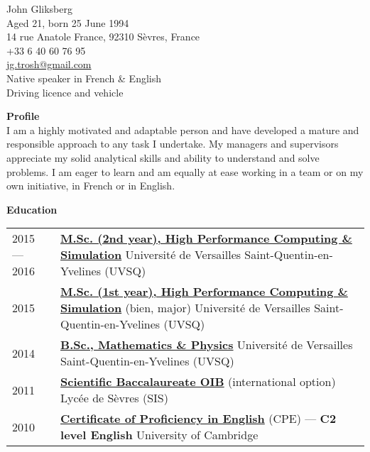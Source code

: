 \documentclass[pdftex,a4paper,10pt]{article}
\begin{document}

{\Large John Gliksberg}
\hrulefill\\
\newline
Aged 21, born 25 June 1994\\
14 rue Anatole France, 92310 Sèvres, France\\[.1cm]
+33 6 40 60 76 95\\
\href{mailto:jg.trosh@gmail.com}
{jg.trosh\makeatletter @\makeatother gmail.com}\\[.1cm]
Native speaker in French \& English\\
Driving licence and vehicle

\begin{center}
\end{center}
\vspace{.3cm}

{\large\bf Profile}
\hrulefill\\[.3cm]
{\setlength{\extrarowheight}{.2cm}
I am a highly motivated and adaptable person and have developed
a mature and responsible approach to any task I undertake.
My managers and supervisors appreciate my solid analytical skills
and ability to understand and solve problems.
I am eager to learn and am equally at ease working in a team
or on my own initiative, in French or in English.
}
\vspace{.3cm}

{\large\bf Education}
\hrulefill\\[.3cm]
{\setlength{\extrarowheight}{.2cm}
\begin{tabularx}{\textwidth}{lX}
2015 \---- 2016 &
\href{http://mihps.prism.uvsq.fr}
{\bf M.Sc. (2nd year), High Performance Computing \& Simulation}
\newline
Université de Versailles Saint-Quentin-en-Yvelines (UVSQ) \\
2015 &
\href{http://mihps.prism.uvsq.fr}
{\bf M.Sc. (1st year), High Performance Computing \& Simulation}
(bien, major)
\newline
Université de Versailles Saint-Quentin-en-Yvelines (UVSQ) \\
2014 &
\href{http://www.uvsq.fr/double-licence-mathematiques-et-physique-343617.kjsp}
{\bf B.Sc., Mathematics \& Physics}
\newline
Université de Versailles Saint-Quentin-en-Yvelines (UVSQ) \\
2011 &
\href{http://www.education.gouv.fr/cid20999/l-option-internationale-du-baccalaureat-o.i.b.html}
{\bf Scientific Baccalaureate OIB} (international option)
\newline
Lycée de Sèvres (SIS) \\
2010 &
\href{http://www.cambridgeenglish.org/exams/proficiency/}
{\bf Certificate of Proficiency in English} (CPE)
\---- {\bf C2 level English}
\newline
University of Cambridge
\end{tabularx}}
\vspace{.3cm}
\end{document}
